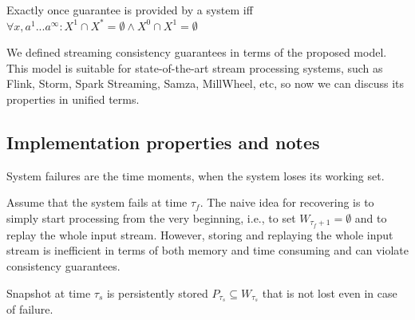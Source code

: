 \begin{definition}{Exactly once}
guarantee is provided by a system iff $\forall{x,a^{1}...a^\infty}:X^{1}\cap{X^{*}}=\emptyset \wedge X^{0}\cap{X^{1}}=\emptyset$
\end{definition}


We defined streaming consistency guarantees in terms of the proposed model. This model is suitable for state-of-the-art stream processing systems, such as Flink, Storm, Spark Streaming, Samza, MillWheel, etc, so now we can discuss its properties in unified terms.

\subsection{Implementation properties and notes}


\begin{definition}{System failures}
are the time moments, when the system loses its working set. 
\end{definition}

Assume that the system fails at time $\tau_f$. The naive idea for recovering is to simply start processing from the very beginning, i.e., to set $W_{\tau_f+1}=\emptyset$ and to replay the whole input stream. However, storing and replaying the whole input stream is inefficient in terms of both memory and time consuming and can violate consistency guarantees.

\begin{definition}{Snapshot}
at time $\tau_s$ is persistently stored $P_{\tau_s}\subseteq{W_{\tau_s}}$ that is not lost even in case of failure.
\end{definition}

